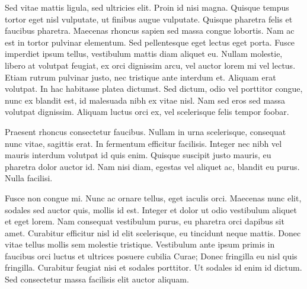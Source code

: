 



\maketitle

Sed vitae mattis ligula, sed ultricies elit. Proin id nisi magna. Quisque tempus tortor eget nisl vulputate, ut finibus augue vulputate. Quisque pharetra felis et faucibus pharetra. Maecenas rhoncus sapien sed massa congue lobortis. Nam ac est in tortor pulvinar elementum. Sed pellentesque eget lectus eget porta. Fusce imperdiet ipsum tellus, vestibulum mattis diam aliquet eu. Nullam molestie, libero at volutpat feugiat, ex orci dignissim arcu, vel auctor lorem mi vel lectus. Etiam rutrum pulvinar justo, nec tristique ante interdum et. Aliquam erat volutpat. In hac habitasse platea dictumst. Sed dictum, odio vel porttitor congue, nunc ex blandit est, id malesuada nibh ex vitae nisl. Nam sed eros sed massa volutpat dignissim. Aliquam luctus orci ex, vel scelerisque felis tempor foobar.


Praesent rhoncus consectetur faucibus. Nullam in urna scelerisque, consequat nunc vitae, sagittis erat. In fermentum efficitur facilisis. Integer nec nibh vel mauris interdum volutpat id quis enim. Quisque suscipit justo mauris, eu pharetra dolor auctor id. Nam nisi diam, egestas vel aliquet ac, blandit eu purus. Nulla facilisi.

Fusce non congue mi. Nunc ac ornare tellus, eget iaculis orci. Maecenas nunc elit, sodales sed auctor quis, mollis id est. Integer et dolor ut odio vestibulum aliquet et eget lorem. Nam consequat vestibulum purus, eu pharetra orci dapibus sit amet. Curabitur efficitur nisl id elit scelerisque, eu tincidunt neque mattis. Donec vitae tellus mollis sem molestie tristique. Vestibulum ante ipsum primis in faucibus orci luctus et ultrices posuere cubilia Curae; Donec fringilla eu nisl quis fringilla. Curabitur feugiat nisi et sodales porttitor. Ut sodales id enim id dictum. Sed consectetur massa facilisis elit auctor aliquam.


